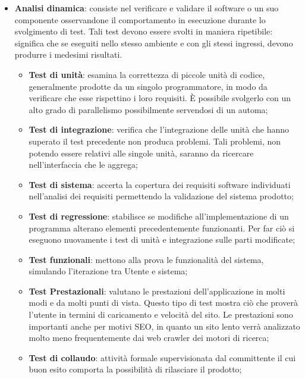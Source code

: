 {{\begin{itemize}
		\item \textbf{Analisi dinamica}: consiste nel verificare e validare il software o un suo componente osservandone il comportamento in esecuzione durante lo svolgimento di test. Tali test devono essere svolti in maniera ripetibile: significa che se eseguiti nello stesso ambiente e con gli stessi ingressi, devono produrre i medesimi risultati.
		\begin{itemize}
			\item \textbf{Test di unità}: esamina la correttezza di piccole unità di codice, generalmente prodotte da un singolo programmatore, in modo da verificare che esse rispettino i loro requisiti. È possibile svolgerlo con un alto grado di parallelismo possibilmente servendosi di un automa;		
			\item \textbf{Test di integrazione}: verifica che l'integrazione delle unità che hanno superato il test precedente non produca problemi. Tali problemi, non potendo essere relativi alle singole unità, saranno da ricercare nell'interfaccia che le aggrega;	
			\item \textbf{Test di sistema}: accerta la copertura dei requisiti software individuati nell'analisi dei requisiti permettendo la validazione del sistema prodotto;
			\item \textbf{Test di regressione}: stabilisce se modifiche all'implementazione di un programma alterano elementi precedentemente funzionanti. Per far ciò si eseguono nuovamente i test di unità e integrazione sulle parti modificate;			
			\item \textbf{Test funzionali}: mettono alla prova le funzionalità del sistema, simulando l'iterazione tra Utente e sistema;		
			\item \textbf{Test Prestazionali}: valutano le prestazioni dell'applicazione in molti modi e da molti punti di vista. Questo tipo di test mostra ciò che proverà l'utente in termini di caricamento e velocità del sito. Le prestazioni sono importanti anche per motivi SEO, in quanto un sito lento verrà analizzato molto meno frequentemente dai web crawler dei motori di ricerca;			
			\item \textbf{Test di collaudo}: attività formale supervisionata dal committente il cui buon esito comporta la possibilità di rilasciare il prodotto;
		\end{itemize}
	\end{itemize}
	}
}
